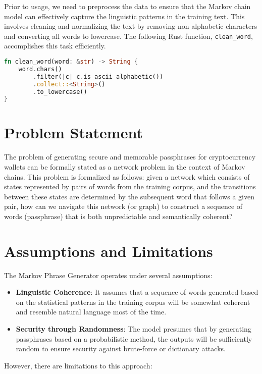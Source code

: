 \documentclass[a4paper,12pt]{article}
\begin{document}
Prior to usage, we need to preprocess the data to ensure that the Markov chain model can effectively capture the linguistic patterns in the training text. This involves cleaning and normalizing the text by removing non-alphabetic characters and converting all words to lowercase. The following Rust function, \texttt{clean\_word}, accomplishes this task efficiently.

\begin{lstlisting}[language=Rust, caption={Preprocessing Function}]
  fn clean_word(word: &str) -> String {
    word.chars()
        .filter(|c| c.is_ascii_alphabetic())
        .collect::<String>()
        .to_lowercase()
}
\end{lstlisting}

\section{Problem Statement}
The problem of generating secure and memorable passphrases for cryptocurrency wallets can be formally stated as a network problem in the context of Markov chains. This problem is formalized as follows: given a network which consists of states represented by pairs of words from the training corpus, and the transitions between these states are determined by the subsequent word that follows a given pair,
how can we navigate this network (or graph) to construct a sequence of words (passphrase) that is both unpredictable and semantically coherent?

\section{Assumptions and Limitations}
The Markov Phrase Generator operates under several assumptions:

\begin{itemize}
  \item \textbf{Linguistic Coherence}: It assumes that a sequence of words generated based on the statistical patterns in the training corpus will be somewhat coherent and resemble natural language most of the time.
  \item \textbf{Security through Randomness}: The model presumes that by generating passphrases based on a probabilistic method, the outputs will be sufficiently random to ensure security against brute-force or dictionary attacks.
\end{itemize}

However, there are limitations to this approach:
\end{document}
